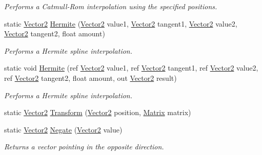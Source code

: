 \begin{DoxyCompactItemize}
\begin{DoxyCompactList}\small\item\em Performs a Catmull-\/\+Rom interpolation using the specified positions.\end{DoxyCompactList}\item 
static \hyperlink{struct_microsoft_1_1_xna_1_1_framework_1_1_vector2}{Vector2} \hyperlink{struct_microsoft_1_1_xna_1_1_framework_1_1_vector2_ae6253f517ec3855591969fe64ad88985}{Hermite} (\hyperlink{struct_microsoft_1_1_xna_1_1_framework_1_1_vector2}{Vector2} value1, \hyperlink{struct_microsoft_1_1_xna_1_1_framework_1_1_vector2}{Vector2} tangent1, \hyperlink{struct_microsoft_1_1_xna_1_1_framework_1_1_vector2}{Vector2} value2, \hyperlink{struct_microsoft_1_1_xna_1_1_framework_1_1_vector2}{Vector2} tangent2, float amount)
\begin{DoxyCompactList}\small\item\em Performs a Hermite spline interpolation.\end{DoxyCompactList}\item 
static void \hyperlink{struct_microsoft_1_1_xna_1_1_framework_1_1_vector2_aca62b3073db26b1561a1e905c45003ca}{Hermite} (ref \hyperlink{struct_microsoft_1_1_xna_1_1_framework_1_1_vector2}{Vector2} value1, ref \hyperlink{struct_microsoft_1_1_xna_1_1_framework_1_1_vector2}{Vector2} tangent1, ref \hyperlink{struct_microsoft_1_1_xna_1_1_framework_1_1_vector2}{Vector2} value2, ref \hyperlink{struct_microsoft_1_1_xna_1_1_framework_1_1_vector2}{Vector2} tangent2, float amount, out \hyperlink{struct_microsoft_1_1_xna_1_1_framework_1_1_vector2}{Vector2} result)
\begin{DoxyCompactList}\small\item\em Performs a Hermite spline interpolation.\end{DoxyCompactList}\item 
static \hyperlink{struct_microsoft_1_1_xna_1_1_framework_1_1_vector2}{Vector2} \hyperlink{struct_microsoft_1_1_xna_1_1_framework_1_1_vector2_a48b225b38328287410a008c132fce766}{Transform} (\hyperlink{struct_microsoft_1_1_xna_1_1_framework_1_1_vector2}{Vector2} position, \hyperlink{struct_microsoft_1_1_xna_1_1_framework_1_1_matrix}{Matrix} matrix)
\item 
static \hyperlink{struct_microsoft_1_1_xna_1_1_framework_1_1_vector2}{Vector2} \hyperlink{struct_microsoft_1_1_xna_1_1_framework_1_1_vector2_a2bd16ffd90e8adba2dd788742578596f}{Negate} (\hyperlink{struct_microsoft_1_1_xna_1_1_framework_1_1_vector2}{Vector2} value)
\begin{DoxyCompactList}\small\item\em Returns a vector pointing in the opposite direction.\end{DoxyCompactList}\item 

\end{DoxyCompactItemize}
